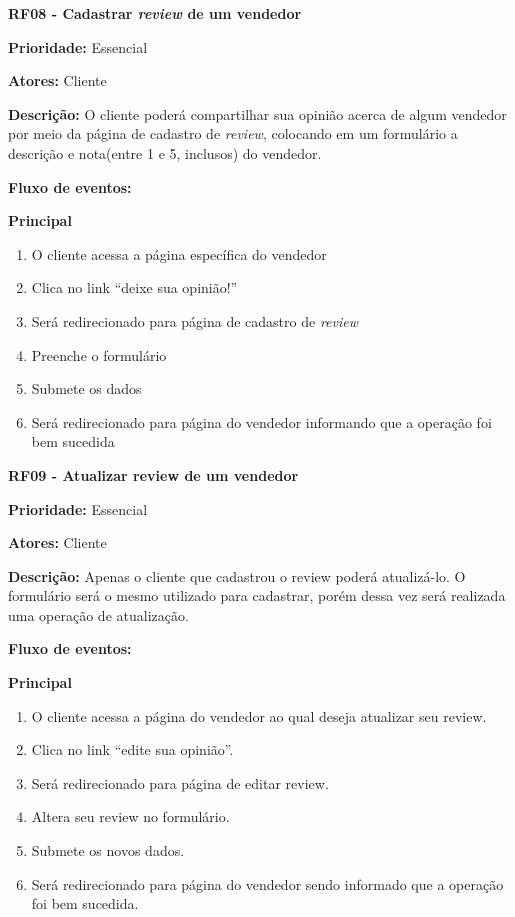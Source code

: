 \begin{apendicesenv}
\textbf{RF08 - Cadastrar \textit{review} de um vendedor} \par
\textbf{Prioridade:} Essencial \par
\textbf{Atores:} Cliente \par
\textbf{Descrição:} O cliente poderá compartilhar sua opinião acerca de algum vendedor por meio da página de cadastro de \textit{review}, colocando em um formulário a descrição e nota(entre 1 e 5, inclusos) do vendedor. \par
\textbf{Fluxo de eventos:} \par
\textbf{Principal} \par
\begin{enumerate}
  \item O cliente acessa a página específica do vendedor
  \item Clica no link “deixe sua opinião!”
  \item Será redirecionado para página de cadastro de \textit{review}
  \item Preenche o formulário
  \item Submete os dados
  \item Será redirecionado para página do vendedor informando que a operação foi bem sucedida
\end{enumerate}

\textbf{RF09 - Atualizar review de um vendedor} \par
\textbf{Prioridade:} Essencial \par
\textbf{Atores:} Cliente \par
\textbf{Descrição:} Apenas o cliente que cadastrou o review poderá atualizá-lo. O formulário será o mesmo utilizado para cadastrar, porém dessa vez será realizada uma operação de atualização. \par
\textbf{Fluxo de eventos:} \par
\textbf{Principal} \par
\begin{enumerate}
  \item O cliente acessa a página do vendedor ao qual deseja atualizar seu review.
  \item Clica no link “edite sua opinião”.
  \item Será redirecionado para página de editar review.
  \item Altera seu review no formulário.
  \item Submete os novos dados.
  \item Será redirecionado para página do vendedor sendo informado que a operação foi bem sucedida.
\end{enumerate}


\end{apendicesenv}
